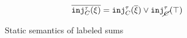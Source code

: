 \begin{figure}[ht]
  \begin{align*}
    \cdual{\cinj{C}{\tau}{\xi}} & = \cinj{C}{\tau}{\cdual{\xi}} \vee \cinj{\notC}{\tau}{\ctruth}
  \end{align*}


  \begin{mathpar}

  \end{mathpar}


  \begin{mathpar}
  \end{mathpar}


  \begin{mathpar}
  \end{mathpar}

  \caption{Static semantics of labeled sums}
  \label{fig:labeled-sums-statics}
\end{figure}
 